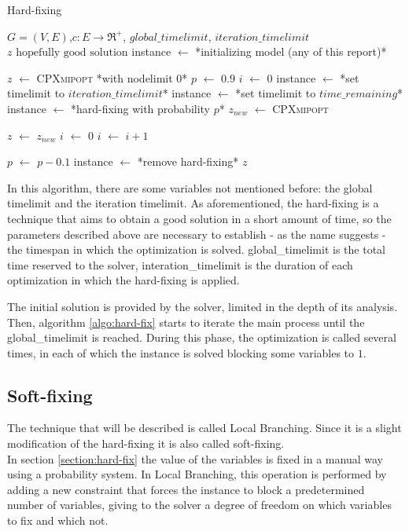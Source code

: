 \begin{algorithm}
	\caption{Hard-fixing}\label{algo:hard-fix}
	\begin{algorithmic}[1]
		\Require $G=(V,E)$,$ c:E\rightarrow \Re^+$, $global\_timelimit$, $iteration\_timelimit$
		\Ensure $z\text{ hopefully good solution}$
		\State instance $\gets$ *initializing model (any of this report)*
		
		\State  $z$ $\gets$ \textsc{CPXmipopt} *with nodelimit 0*
		\State $p$ $\gets$ $0.9$
		\State $i$ $\gets$ $0$
				\State instance $\gets$ *set timelimit to $iteration\_timelimit$*
			\Else 
				\State instance $\gets$ *set timelimit to $time\_remaining$*
			\EndIf
			\State instance $\gets$ *hard-fixing with probability $p$*
			\State $z_{new}$ $\gets$ \textsc{CPXmipopt}
			
				\State $z$ $\gets$ $z_{new}$
				\State $i$ $\gets$ $0$
			\Else 
				\State $i$ $\gets$ $i+1$
			\EndIf
			
				\State $p$ $\gets$ $p - 0.1$
			\EndIf
			\State instance $\gets$ *remove hard-fixing*
		\EndWhile
		\State \Return $z$
	\end{algorithmic}
\end{algorithm}

In this algorithm, there are some variables not mentioned before: the global timelimit and the iteration timelimit. As aforementioned, the hard-fixing is a technique that aims to obtain a good solution in a short amount of time, so the parameters described above are necessary to establish - as the name suggests - the timespan in which the optimization is solved. global\_timelimit is the total time reserved to the solver, interation\_timelimit is the duration of each optimization in which the hard-fixing is applied.

The initial solution is provided by the solver, limited in the depth of its analysis. Then, algorithm \ref{algo:hard-fix} starts to iterate the main process until the global\_timelimit is reached. During this phase, the optimization is called several times, in each of which the instance is solved blocking some variables to $1$.

\subsection{Soft-fixing}
The technique that will be described is called Local Branching. Since it is a slight modification of the hard-fixing it is also called soft-fixing.\\
In section \ref{section:hard-fix} the value of the variables is fixed in a manual way using a probability system. In Local Branching, this operation is performed by adding a new constraint that forces the instance to block a predetermined number of variables, giving to the solver a degree of freedom on which variables to fix and which not.

